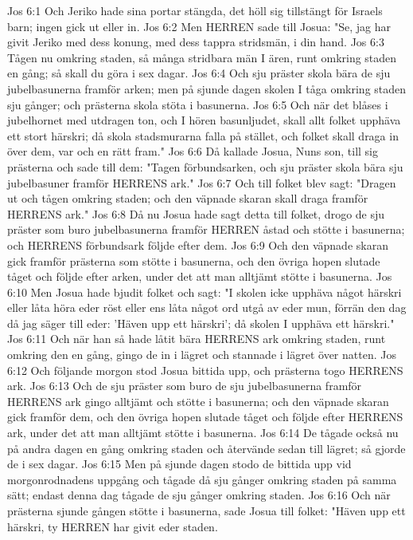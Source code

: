 Jos 6:1  Och Jeriko hade sina portar stängda, det höll sig tillstängt för Israels barn; ingen gick ut eller in.
Jos 6:2  Men HERREN sade till Josua: "Se, jag har givit Jeriko med dess konung, med dess tappra stridsmän, i din hand.
Jos 6:3  Tågen nu omkring staden, så många stridbara män I ären, runt omkring staden en gång; så skall du göra i sex dagar.
Jos 6:4  Och sju präster skola bära de sju jubelbasunerna framför arken; men på sjunde dagen skolen I tåga omkring staden sju gånger; och prästerna skola stöta i basunerna.
Jos 6:5  Och när det blåses i jubelhornet med utdragen ton, och I hören basunljudet, skall allt folket upphäva ett stort härskri; då skola stadsmurarna falla på stället, och folket skall draga in över dem, var och en rätt fram."
Jos 6:6  Då kallade Josua, Nuns son, till sig prästerna och sade till dem: "Tagen förbundsarken, och sju präster skola bära sju jubelbasuner framför HERRENS ark."
Jos 6:7  Och till folket blev sagt: "Dragen ut och tågen omkring staden; och den väpnade skaran skall draga framför HERRENS ark."
Jos 6:8  Då nu Josua hade sagt detta till folket, drogo de sju präster som buro jubelbasunerna framför HERREN åstad och stötte i basunerna; och HERRENS förbundsark följde efter dem.
Jos 6:9  Och den väpnade skaran gick framför prästerna som stötte i basunerna, och den övriga hopen slutade tåget och följde efter arken, under det att man alltjämt stötte i basunerna.
Jos 6:10  Men Josua hade bjudit folket och sagt: "I skolen icke upphäva något härskri eller låta höra eder röst eller ens låta något ord utgå av eder mun, förrän den dag då jag säger till eder: 'Häven upp ett härskri'; då skolen I upphäva ett härskri."
Jos 6:11  Och när han så hade låtit bära HERRENS ark omkring staden, runt omkring den en gång, gingo de in i lägret och stannade i lägret över natten.
Jos 6:12  Och följande morgon stod Josua bittida upp, och prästerna togo HERRENS ark.
Jos 6:13  Och de sju präster som buro de sju jubelbasunerna framför HERRENS ark gingo alltjämt och stötte i basunerna; och den väpnade skaran gick framför dem, och den övriga hopen slutade tåget och följde efter HERRENS ark, under det att man alltjämt stötte i basunerna.
Jos 6:14  De tågade också nu på andra dagen en gång omkring staden och återvände sedan till lägret; så gjorde de i sex dagar.
Jos 6:15  Men på sjunde dagen stodo de bittida upp vid morgonrodnadens uppgång och tågade då sju gånger omkring staden på samma sätt; endast denna dag tågade de sju gånger omkring staden.
Jos 6:16  Och när prästerna sjunde gången stötte i basunerna, sade Josua till folket: "Häven upp ett härskri, ty HERREN har givit eder staden.
